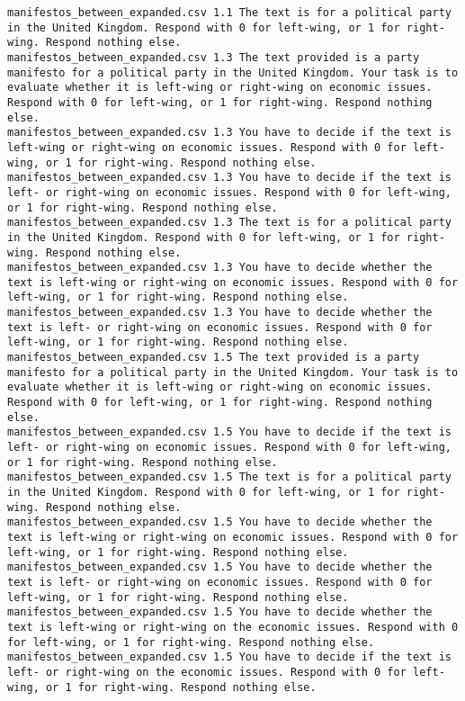 \begin{lstlisting}[label=lst:promptvariants]
manifestos_between_expanded.csv	1.1	The text is for a political party in the United Kingdom. Respond with 0 for left-wing, or 1 for right-wing. Respond nothing else.
manifestos_between_expanded.csv	1.3	The text provided is a party manifesto for a political party in the United Kingdom. Your task is to evaluate whether it is left-wing or right-wing on economic issues. Respond with 0 for left-wing, or 1 for right-wing. Respond nothing else.
manifestos_between_expanded.csv	1.3	You have to decide if the text is left-wing or right-wing on economic issues. Respond with 0 for left-wing, or 1 for right-wing. Respond nothing else.
manifestos_between_expanded.csv	1.3	You have to decide if the text is left- or right-wing on economic issues. Respond with 0 for left-wing, or 1 for right-wing. Respond nothing else.
manifestos_between_expanded.csv	1.3	The text is for a political party in the United Kingdom. Respond with 0 for left-wing, or 1 for right-wing. Respond nothing else.
manifestos_between_expanded.csv	1.3	You have to decide whether the text is left-wing or right-wing on economic issues. Respond with 0 for left-wing, or 1 for right-wing. Respond nothing else.
manifestos_between_expanded.csv	1.3	You have to decide whether the text is left- or right-wing on economic issues. Respond with 0 for left-wing, or 1 for right-wing. Respond nothing else.
manifestos_between_expanded.csv	1.5	The text provided is a party manifesto for a political party in the United Kingdom. Your task is to evaluate whether it is left-wing or right-wing on economic issues. Respond with 0 for left-wing, or 1 for right-wing. Respond nothing else.
manifestos_between_expanded.csv	1.5	You have to decide if the text is left- or right-wing on economic issues. Respond with 0 for left-wing, or 1 for right-wing. Respond nothing else.
manifestos_between_expanded.csv	1.5	The text is for a political party in the United Kingdom. Respond with 0 for left-wing, or 1 for right-wing. Respond nothing else.
manifestos_between_expanded.csv	1.5	You have to decide whether the text is left-wing or right-wing on economic issues. Respond with 0 for left-wing, or 1 for right-wing. Respond nothing else.
manifestos_between_expanded.csv	1.5	You have to decide whether the text is left- or right-wing on economic issues. Respond with 0 for left-wing, or 1 for right-wing. Respond nothing else.
manifestos_between_expanded.csv	1.5	You have to decide whether the text is left-wing or right-wing on the economic issues. Respond with 0 for left-wing, or 1 for right-wing. Respond nothing else.
manifestos_between_expanded.csv	1.5	You have to decide if the text is left- or right-wing on the economic issues. Respond with 0 for left-wing, or 1 for right-wing. Respond nothing else.

\end{lstlisting}
